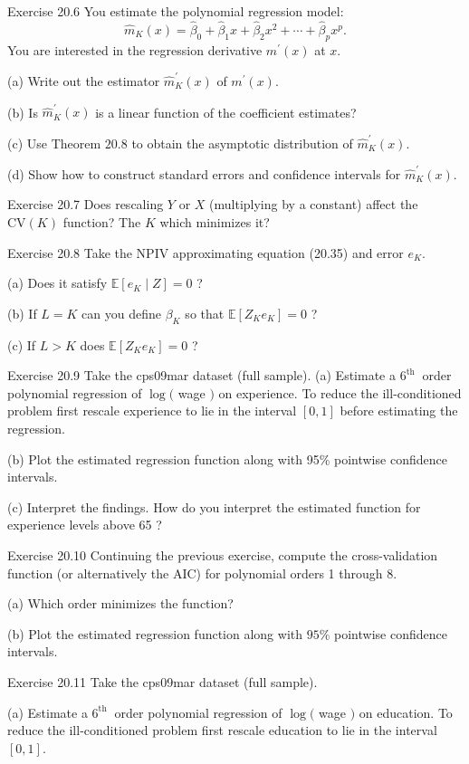\documentclass[10pt]{article}
\begin{document}
Exercise 20.6 You estimate the polynomial regression model:
$$
\widehat{m}_{K}(x)=\widehat{\beta}_{0}+\widehat{\beta}_{1} x+\widehat{\beta}_{2} x^{2}+\cdots+\widehat{\beta}_{p} x^{p} .
$$
You are interested in the regression derivative $m^{\prime}(x)$ at $x$.

(a) Write out the estimator $\widehat{m}_{K}^{\prime}(x)$ of $m^{\prime}(x)$.

(b) Is $\widehat{m}_{K}^{\prime}(x)$ is a linear function of the coefficient estimates?

(c) Use Theorem $20.8$ to obtain the asymptotic distribution of $\widehat{m}_{K}^{\prime}(x)$.

(d) Show how to construct standard errors and confidence intervals for $\widehat{m}_{K}^{\prime}(x)$.

Exercise 20.7 Does rescaling $Y$ or $X$ (multiplying by a constant) affect the $\mathrm{CV}(K)$ function? The $K$ which minimizes it?

Exercise 20.8 Take the NPIV approximating equation (20.35) and error $e_{K}$.

(a) Does it satisfy $\mathbb{E}\left[e_{K} \mid Z\right]=0$ ?

(b) If $L=K$ can you define $\beta_{K}$ so that $\mathbb{E}\left[Z_{K} e_{K}\right]=0$ ?

(c) If $L>K$ does $\mathbb{E}\left[Z_{K} e_{K}\right]=0$ ?

Exercise 20.9 Take the cps09mar dataset (full sample). (a) Estimate a $6^{\text {th }}$ order polynomial regression of $\log ($ wage $)$ on experience. To reduce the ill-conditioned problem first rescale experience to lie in the interval $[0,1]$ before estimating the regression.

(b) Plot the estimated regression function along with 95\% pointwise confidence intervals.

(c) Interpret the findings. How do you interpret the estimated function for experience levels above 65 ?

Exercise 20.10 Continuing the previous exercise, compute the cross-validation function (or alternatively the AIC) for polynomial orders 1 through 8.

(a) Which order minimizes the function?

(b) Plot the estimated regression function along with $95 \%$ pointwise confidence intervals.

Exercise 20.11 Take the cps09mar dataset (full sample).

(a) Estimate a $6^{\text {th }}$ order polynomial regression of $\log ($ wage $)$ on education. To reduce the ill-conditioned problem first rescale education to lie in the interval $[0,1]$.
\end{document}
